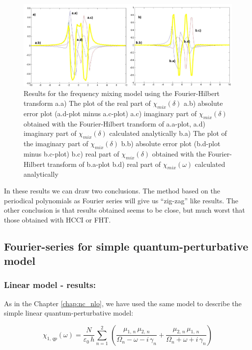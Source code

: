\documentclass[12pt,twoside,a4paper]{article}
\numberwithin{equation}{subsection}
\numberwithin{figure}{subsection}
\begin{document}
\begin{figure} 
  \includegraphics[width=150mm]{img/four_fmix.png}
  \caption{Results for the frequency mixing model using the Fourier-Hilbert transform
     a.a) The plot of the real part of ${\chi_{mix}}(\delta )$
     a.b) absolute error plot (a.d-plot minus a.c-plot)
     a.c) imaginary part of ${\chi_{mix}}(\delta )$ obtained with the Fourier-Hilbert transform of a.a-plot, 
     a.d) imaginary part of ${\chi_{mix}}(\delta )$ calculated analytically 
     b.a) The plot of the imaginary part of ${\chi_{mix}}(\delta )$ 
     b.b) absolute error plot (b.d-plot minus b.c-plot)
     b.c) real part of ${\chi_{mix}}(\delta )$ obtained with the Fourier-Hilbert transform of b.a-plot  
     b.d) real part of $\chi_{mix} (\omega )$ calculated analytically 
     \label{fig:four_fmix}
     }
\end{figure}

In these results we can draw two conclusions. The method based on the periodical polynomials as Fourier series will
give us ``zig-zag'' like results. The other conclusion is that results obtained seems to be close, but much worst that those
obtained with HCCI or FHT. 

\subsection{Fourier-series for simple quantum-perturbative model} \label{chap:fourier_quantum}

\subsubsection*{Linear model - results:}

As in the Chapter \ref{chap:nc_nlo}, we have used the same model to describe the simple linear quantum-perturbative model: 

\begin{equation} \label{eq:four_qp}
  {\chi_{1, \,qp}}(\omega ) = \frac {N}{\varepsilon_0\,h} \sum_{n=1}^{2}\,(\frac {{\mu_{1, \,n}}\,{ \mu_{2, \,n}}}{{\Omega_{n}}
  - \omega  - i\,{\gamma_{n}}} + \frac {{\mu_{2, \,n}}\,{\mu_{1, \,n}}}{{\Omega_{n}} + \omega + i\,{\gamma_{n}}})
\end{equation}
\end{document}
